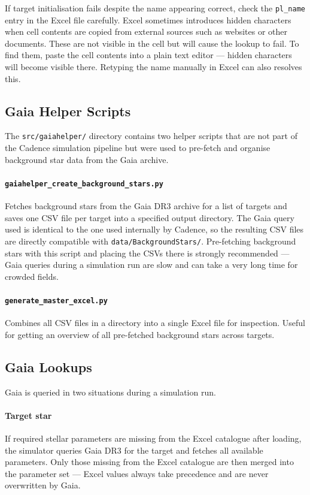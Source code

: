 If target initialisation fails despite the name appearing correct, check the \texttt{pl\_name} entry in the Excel file carefully. Excel sometimes introduces hidden characters when cell contents are copied from external sources such as websites or other documents. These are not visible in the cell but will cause the lookup to fail. To find them, paste the cell contents into a plain text editor — hidden characters will become visible there. Retyping the name manually in Excel can also resolves this.


\subsection{Gaia Helper Scripts}

The \texttt{src/gaiahelper/} directory contains two helper scripts that are not part of the Cadence simulation pipeline but were used to pre-fetch and organise background star data from the Gaia archive.

\paragraph{\texttt{gaiahelper\_create\_background\_stars.py}}
Fetches background stars from the Gaia DR3 archive for a list of targets and saves one CSV file per target into a specified output directory. The Gaia query used is identical to the one used internally by Cadence, so the resulting CSV files are directly compatible with \texttt{data/BackgroundStars/}. Pre-fetching background stars with this script and placing the CSVs there is strongly recommended — Gaia queries during a simulation run are slow and can take a very long time for crowded fields.

\paragraph{\texttt{generate\_master\_excel.py}}
Combines all CSV files in a directory into a single Excel file for inspection. Useful for getting an overview of all pre-fetched background stars across targets.


\subsection{Gaia Lookups}
\label{sec:gaia_lookups}

Gaia is queried in two situations during a simulation run.

\paragraph{Target star} If required stellar parameters are missing from the Excel catalogue after loading, the simulator queries Gaia DR3 for the target and fetches all available parameters. Only those missing from the Excel catalogue are then merged into the parameter set — Excel values always take precedence and are never overwritten by Gaia.

